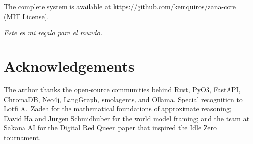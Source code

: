 \documentclass[12pt,a4paper]{article}
\begin{document}
The complete system is available at \url{https://github.com/kemquiros/zana-core} (MIT License).

\bigskip
\begin{center}
\textit{\large Este es mi regalo para el mundo.}
\end{center}

\section*{Acknowledgements}

The author thanks the open-source communities behind Rust, PyO3, FastAPI, ChromaDB, Neo4j, LangGraph,
smolagents, and Ollama. Special recognition to Lotfi A.\ Zadeh for the mathematical foundations of
approximate reasoning; David Ha and J\"{u}rgen Schmidhuber for the world model framing; and the team at
Sakana AI for the Digital Red Queen paper that inspired the Idle Zero tournament.
\end{document}
